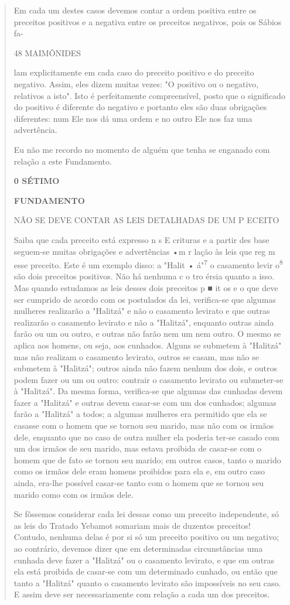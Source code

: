 \begin{quote}
Em cada um destes casos devemos contar a ordem positiva entre os
preceitos positivos e a negativa entre os preceitos negativos, pois os
Sábios fa-

48 MAIMÔNIDES

lam explicitamente em cada caso do preceito positivo e do preceito
negativo. Assim, eles dizem muitas vezes: "O positivo ou o negativo,
relativos a isto". Isto é perfeitamente compreensível, posto que o
significado do positivo é dife­rente do negativo e portanto eles são
duas obrigações diferentes: num Ele nos dá uma ordem e no outro Ele nos
faz uma advertência.

Eu não me recordo no momento de alguém que tenha se enganado com relação
a este Fundamento.

\textbf{0 SÉTIMO}

\textbf{FUNDAMENTO}

NÃO SE DEVE CONTAR AS LEIS DETALHADAS DE UM P ECEITO

Saiba que cada preceito está expresso n s E crituras e a partir des base
seguem-se muitas obrigações e advertências •m r lação às leis que reg m
esse preceito. Este é um exemplo disso: a "Halit • á"\textsuperscript{7}
o casamento levir o\textsuperscript{8} são dois preceitos positivos. Não
há nenhuma c o tro érsia quanto a isso. Mas quando estudamos as leis
desses dois preceitos p ■ it os e o que deve ser cum­prido de acordo com
os postulados da lei, verifica-se que algumas mulheres realizarão a
"Halitzá" e não o casamento levirato e que outras realizarão o
casa­mento levirato e não a "Halitzá", enquanto outras ainda farão ou um
ou outro, e outras não farão nem um nem outro. O mesmo se aplica aos
homens, ou seja, aos cunhados. Alguns se submetem à "Halitzá" mas não
realizam o casamento levirato, outros se casam, mas não se submetem à
"Halitzá"; outros ainda não fazem nenhum dos dois, e outros podem fazer
ou um ou outro: contrair o casa­mento levirato ou submeter-se à
"Halitzá". Da mesma forma, verifica-se que algumas das cunhadas devem
fazer a "Halitzá" e outras devem casar-se com um dos cunhados; algumas
farão a "Halitzá" a todos; a algumas mulheres era permitido que ela se
casasse com o homem que se tornou seu marido, mas não com os irmãos
dele, enquanto que no caso de outra mulher ela poderia ter-se casado com
um dos irmãos de seu marido, mas estava proibida de casar-se com o homem
que de fato se tornou seu marido; em outros casos, tanto o marido como
os irmãos dele eram homens proibidos para ela e, em outro caso ainda,
era-lhe possível casar-se tanto com o homem que se tornou seu marido
como com os irmãos dele.

Se fôssemos considerar cada lei dessas como um preceito indepen­dente,
só as leis do Tratado Yebamot somariam mais de duzentos preceitos!
Contudo, nenhuma delas é por si só um preceito positivo ou um negativo;
ao contrário, devemos dizer que em determinadas circunstâncias uma
cunhada deve fazer a "Halitzá" ou o casamento levirato, e que em outras
ela está proibida de casar-se com um determinado cunhado, ou então que
tanto a "Halitzá" quan­to o casamento levirato são impossíveis no seu
caso. E assim deve ser necessa­riamente com relação a cada um dos
preceitos.
\end{quote}

